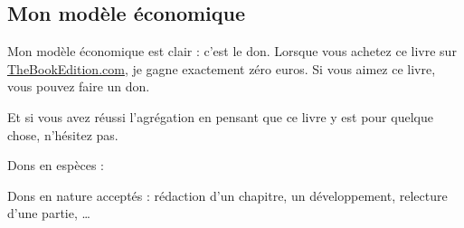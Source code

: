
\subsection*{Mon modèle économique}

Mon modèle économique est clair : c'est le don. Lorsque vous achetez ce livre sur \href{http://www.thebookedition.com/fr/}{TheBookEdition.com}, je gagne exactement zéro euros. Si vous aimez ce livre, vous pouvez faire un don.

Et si vous avez réussi l'agrégation en pensant que ce livre y est pour quelque chose, n'hésitez pas.

Dons en espèces :


Dons en nature acceptés : rédaction d'un chapitre, un développement, relecture d'une partie, \ldots
